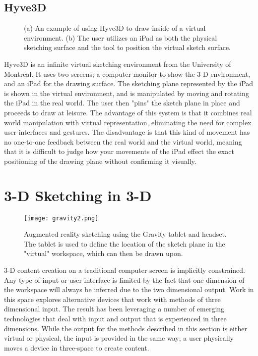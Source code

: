 \subsection{Hyve3D}

\begin{figure}
\centering  
{}
\caption[Using Hyve3D to draw in a virtual environment]{(a) An example of using Hyve3D to draw inside of a virtual environment. (b) The user utilizes an iPad as both the physical sketching surface and the tool to position the virtual sketch surface. \autocite{hyve3d}}

\end{figure}

Hyve3D \autocite{hyve3d} is an infinite virtual sketching environment from the University of Montreal. 
It uses two screens; a computer monitor to show the 3-D environment, and an iPad for the drawing surface. 
The sketching plane represented by the iPad is shown in the virtual environment, and is manipulated by moving and rotating the iPad in the real world. 
The user then "pins" the sketch plane in place and proceeds to draw at leisure. The advantage of this system is that it combines real world manipulation with virtual representation, eliminating the need for complex user interfaces and gestures. 
The disadvantage is that this kind of movement has no one-to-one feedback between the real world and the virtual world, meaning that it is difficult to judge how your movements of the iPad effect the exact positioning of the drawing plane without confirming it visually.



\section{3-D Sketching in 3-D}
\begin{figure}
\texttt{[image: gravity2.png]}
\caption[Augmented Reality Sketching using Gravity]{Augmented reality sketching using the Gravity tablet and headset. The tablet is used to define the location of the sketch plane in the "virtual" workspace, which can then be drawn upon. \autocite{gravitysketch}}
\end{figure}

3-D content creation on a traditional computer screen is implicitly constrained. 
Any type of input or user interface is limited by the fact that one dimension of the workspace will always be inferred due to the two dimensional output.
Work in this space explores alternative devices that work with methods of three dimensional input.
The result has been leveraging a number of emerging technologies that deal with input and output that is experienced in three dimensions.
While the output for the methods described in this section is either virtual or physical, the input is provided in the same way; a user physically moves a device in three-space to create content.

